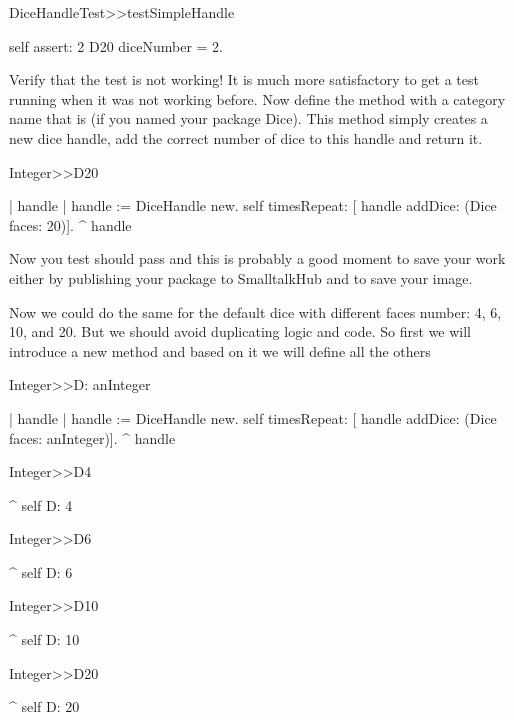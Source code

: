 \documentclass[a4paper,10pt,twoside]{book}
\begin{document}
\begin{code}{}
DiceHandleTest>>testSimpleHandle

	self assert: 2 D20 diceNumber = 2.
\end{code}


Verify that the test is not working! It is much more satisfactory to get a test running when it was not working before. Now define the method  with a category name that is  (if you named your package Dice). This method simply creates a new dice handle, add the correct number of dice to this handle and return it.


\begin{code}{}
Integer>>D20
	
	| handle |
	handle := DiceHandle new.
	self timesRepeat: [ handle addDice:  (Dice faces: 20)].
	^ handle
\end{code}


Now you test should pass and this is probably a good moment to save your work either by publishing your package to SmalltalkHub and to save your image. 

Now we could do the same for the default dice with different faces number: 4, 6, 10, and 20.
But we should avoid duplicating logic and code. So first we will introduce a new method  and based on it we will define all the others


\begin{code}{}
Integer>>D: anInteger
	
	| handle |
	handle := DiceHandle new.
	self timesRepeat: [ handle addDice:  (Dice faces: anInteger)].
	^ handle
\end{code}



\begin{code}{}
Integer>>D4
	
	^ self D: 4
\end{code}



\begin{code}{}
Integer>>D6
	
	^ self D: 6
\end{code}



\begin{code}{}
Integer>>D10
	
	^ self D: 10
\end{code}



\begin{code}{}
Integer>>D20
	
	^ self D: 20
\end{code}
\end{document}
